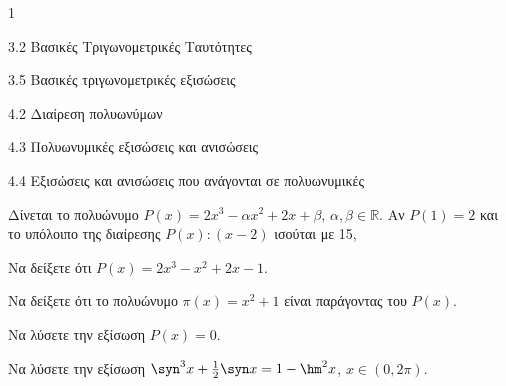 \begin{ylh}{1}
\item 3.2 Βασικές Τριγωνομετρικές Ταυτότητες
\item 3.5 Βασικές τριγωνομετρικές εξισώσεις
\item 4.2 Διαίρεση πολυωνύμων
\item 4.3 Πολυωνυμικές εξισώσεις και ανισώσεις
\item 4.4 Εξισώσεις και ανισώσεις που ανάγονται σε πολυωνυμικές
\end{ylh}
Δίνεται το πολυώνυμο $P(x) = 2x^3 - \alpha x^2 + 2x + \beta$, $\alpha, \beta \in \mathbb{R}$. Αν $P(1) = 2$ και το υπόλοιπο της διαίρεσης $P(x) : (x - 2)$ ισούται με 15,
\begin{alist}
\item Να δείξετε ότι $P(x) = 2x^3 - x^2 + 2x - 1$.
\item
\begin{rlist}
\item Να δείξετε ότι το πολυώνυμο $\pi(x) = x^2 + 1$ είναι παράγοντας του $P(x)$.
\item Να λύσετε την εξίσωση $P(x) = 0$.
\end{rlist}
\item Να λύσετε την εξίσωση $\syn ^3 x + \frac{1}{2}\syn  x = 1 - \hm ^2 x$, $x \in (0, 2\pi)$.
\end{alist}

